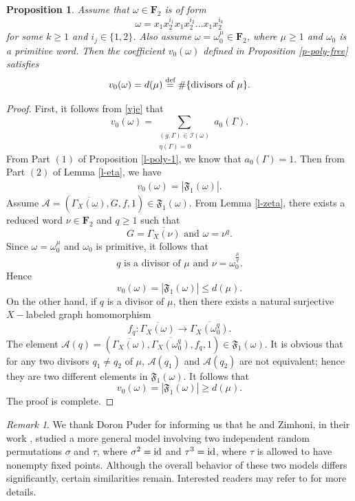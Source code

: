 \documentclass{amsart}
\theoremstyle{plain}
\newtheorem{proposition}[theorem]{Proposition}
\theoremstyle{definition}
\theoremstyle{remark}
\newtheorem*{rem*}{Remark}
\begin{document}
\begin{proposition}\label{p-coeff}
    Assume that $\omega\in\textbf{F}_2$ is of form $$\omega=x_1x_2^{i_1}x_1x_2^{i_2}...x_1x_2^{i_k}$$
        for some $k\geq 1$ and $i_j\in\{1,2\}$.
     Also assume $\omega=\omega_0^\mu\in\textbf{F}_2$, where $\mu\geq 1$ and $\omega_0$ is a primitive word. Then the coefficient $v_0(\omega)$ defined in Proposition \ref{p-poly-free} satisfies
     $$v_0(\omega)=d(\mu)\overset{\textnormal{def}}{=}\#\{\text{divisors of }\mu\}.$$
\end{proposition}
\begin{proof}
First, it follows from \eqref{vje} that
\[v_{0}(\omega)=\sum\limits_{\substack{(g,\Gamma)\in\mathcal{I}(\omega)\\\eta(\Gamma)=0}}a_0(\Gamma).\]
From Part $(1)$ of Proposition \ref{l-poly-1}, we know that $a_0(\Gamma)=1$. Then from Part $(2)$ of Lemma \ref{l-eta}, we have
    \begin{align*}
        v_{0}(\omega)=|\mathfrak{F}_1(\omega)|.
    \end{align*}
    Assume $\mathcal{A}=\left(\overline{\Gamma_X(\omega)},G,f,1\right)\in\mathfrak{F}_1(\omega)$. 
    From Lemma \ref{l-zeta}, there exists a reduced word $\nu\in\textbf{F}_2$ and $q\geq 1$ such that
     $$G=\overline{\Gamma_X(\nu)}\text{ and }\omega=\nu^q.$$
     Since $\omega=\omega_0^\mu$ and $\omega_0$ is primitive, it follows that
     $$q\text{ is a divisor of $\mu$ and }\nu=\omega_0^{\frac{\mu}{q}}.$$ 
     Hence $$v_0(\omega)=|\mathfrak{F}_1(\omega)|\leq d(\mu).$$
On the other hand, if $q$ is a divisor of $\mu$, then there exists a natural surjective $X-$labeled graph homomorphism $$f_q:\overline{\Gamma_X(\omega)}\to\overline{\Gamma_X(\omega_0^q)}.$$
The element $\mathcal{A}(q)=\left(\overline{\Gamma_X(\omega)},\overline{\Gamma_X(\omega_0^q)},f_q,1\right)\in\mathfrak{F}_1(\omega)$.
It is obvious that for any two divisors $q_1\neq q_2$ of $\mu$, $\mathcal{A}(q_1)$ and $\mathcal{A}(q_2)$ are not equivalent; hence they are two different elements in $\mathfrak{F}_1(\omega)$. It follows that $$v_0(\omega)=|\mathfrak{F}_1(\omega)|\geq d(\mu).$$ The proof is complete.
\end{proof}
\begin{rem*}
    We thank Doron Puder for informing us that he and Zimhoni, in their work \cite{PZ24}, studied a more general model involving two independent random permutations $\sigma$ and $\tau$, where $\sigma^2=\textnormal{id}$ and $\tau^3=\textnormal{id}$, where $\tau$ is allowed to have nonempty fixed points. Although the overall behavior of these two models differs significantly, certain similarities remain. Interested readers may refer to \cite{PZ24} for more details. 
    \end{rem*}
\end{document}
